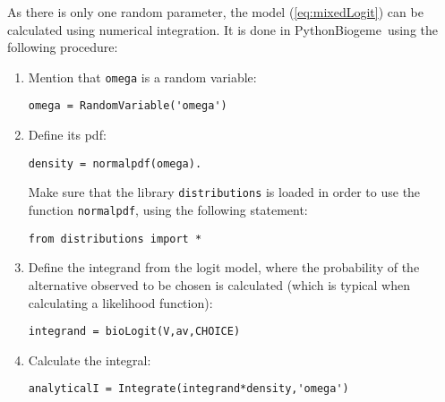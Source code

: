 \documentclass[12pt,a4paper]{article}
\newcommand{\req}[1]{(\ref{#1})}
\newcommand{\PBIOGEME}{PythonBiogeme}
\begin{document}
As there is only one random parameter, the model \req{eq:mixedLogit}
can be calculated using numerical integration. It is done in
\PBIOGEME\ using the following procedure:
\begin{enumerate}
\item Mention that \lstinline$omega$ is a random variable:
\begin{lstlisting}
omega = RandomVariable('omega')
\end{lstlisting}
\item Define its pdf:
\begin{lstlisting}
density = normalpdf(omega).
\end{lstlisting}
Make sure that the library \lstinline$distributions$ is loaded in
order to use the function \lstinline$normalpdf$, using the following
statement:
\begin{lstlisting}
from distributions import *
\end{lstlisting}
\item Define the integrand from the logit model, where the probability
  of the alternative observed to be chosen is calculated (which is
  typical when calculating a likelihood function):
\begin{lstlisting}
integrand = bioLogit(V,av,CHOICE)
\end{lstlisting}
\item Calculate the integral:
\begin{lstlisting}
analyticalI = Integrate(integrand*density,'omega')
\end{lstlisting}
\end{enumerate}
\end{document}

